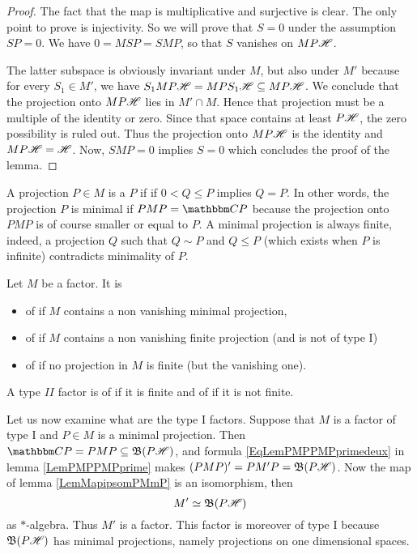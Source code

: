 \begin{proof}
The fact that the map is multiplicative and surjective is clear. The only point to prove is injectivity. So we will prove that $S=0$ under the assumption $SP=0$. We have $0=MSP=SMP$, so that $S$ vanishes on $MP\mathscr{H}$.

The latter subspace is obviously invariant under $M$, but also under $M'$ because for every $S_1\in M'$, we have $S_1MP\mathscr{H}=MPS_1\mathscr{H}\subseteq MP\mathscr{H}$. We conclude that the projection onto $MP\mathscr{H}$ lies in $M'\cap M$. Hence that projection must be a multiple of the identity or zero. Since that space contains at least $P\mathscr{H}$, the zero possibility is ruled out. Thus the projection onto $MP\mathscr{H}$ is the identity and $MP\mathscr{H}=\mathscr{H}$. Now, $SMP=0$ implies $S=0$ which concludes the proof of the lemma.
\end{proof}

A projection $P\in M$ is a  $P$ if if $0<Q\leq P$ implies $Q=P$. In other words, the projection $P$ is minimal if $PMP=\eC P$ because the projection onto $PMP$ is of course smaller or equal to $P$. A minimal projection is always finite, indeed, a projection $Q$ such that $Q\sim P$ and $Q\leq P$ (which exists when $P$ is infinite) contradicts minimality of $P$. 

\begin{definition}
Let $M$ be a factor. It is
\begin{itemize}
\item of  if $M$ contains a non vanishing minimal projection,
\item of  if $M$ contains a non vanishing finite projection (and is not of type I)
\item of  if no projection in $M$ is finite (but the vanishing one).
\end{itemize}
\end{definition}

A type $II$ factor is of  if it is finite and of  if it is not finite.

Let us now examine what are the type I factors.\label{PgtypeIonavu} Suppose that $M$ is a factor of type I and $P\in M$ is a minimal projection. Then $\eC P=PMP\subseteq\oB(P\hH)$, and formula \eqref{EqLemPMPPMPprimedeux} in lemma \ref{LemPMPPMPprime} makes $(PMP)'=PM'P=\mathfrak{B}(P\mathscr{H})$. Now the map of lemma \ref{LemMapipsomPMmP} is an isomorphism, then
\[ 
  M'\simeq\mathfrak{B}(P\mathscr{H})
\]
as $*$-algebra. Thus $M'$ is a factor. This factor is moreover of type I because $\mathfrak{B}(P\mathscr{H})$ has minimal projections, namely projections on one dimensional spaces. 

